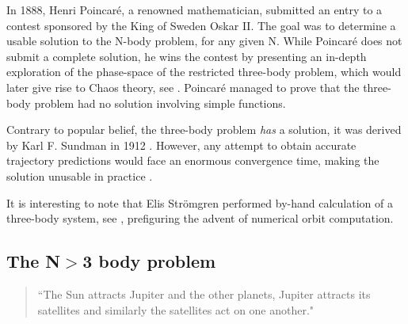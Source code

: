 In 1888, Henri Poincar\'e, a renowned mathematician, submitted an entry to a contest sponsored by the King of Sweden Oskar II. The goal was to determine a usable solution to the N-body problem, for any given N. While Poincar\'e does not submit a complete solution, he wins the contest by presenting an in-depth exploration of the phase-space of the restricted three-body problem, which would later give rise to Chaos theory, see \cite{Yoccoz2010}. Poincar\'e managed to prove that the three-body problem had no  solution involving simple functions.

Contrary to popular belief, the three-body problem \textit{has} a solution, it was derived by Karl F. Sundman in 1912 \citep{Sundman1912}. However, any attempt to obtain accurate trajectory predictions would face an enormous convergence time, making the solution unusable in practice \citep{Beloriszky1930}.

It is interesting to note that Elis Str\"omgren performed by-hand calculation of a three-body system, see \cite{Aarseth2003,Stromgren1909}, prefiguring the advent of numerical orbit computation.

\subsection*{The N$>$3 body problem}

\begin{quote}
``The Sun attracts Jupiter and the other planets, Jupiter attracts its satellites and similarly the satellites act on one another."
\end{quote}



